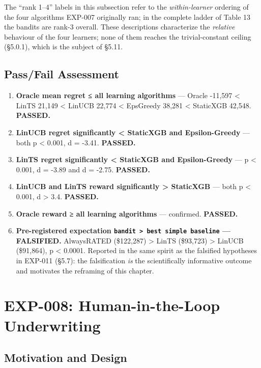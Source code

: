 The ``rank 1--4'' labels in this subsection refer to the \emph{within-learner} ordering of the four algorithms EXP-007 originally ran; in the complete ladder of Table 13 the bandits are rank-3 overall. These descriptions characterize the \emph{relative} behaviour of the four learners; none of them reaches the trivial-constant ceiling (§5.0.1), which is the subject of §5.11.

\subsection{Pass/Fail Assessment}\label{passfail-assessment-2}

\begin{enumerate}
\def\labelenumi{\arabic{enumi}.}
\tightlist
\item
  \textbf{Oracle mean regret ≤ all learning algorithms} --- Oracle -11,597 \textless{} LinTS 21,149 \textless{} LinUCB 22,774 \textless{} EpsGreedy 38,281 \textless{} StaticXGB 42,548. \textbf{PASSED.}
\item
  \textbf{LinUCB regret significantly \textless{} StaticXGB and Epsilon-Greedy} --- both p \textless{} 0.001, d = -3.41. \textbf{PASSED.}
\item
  \textbf{LinTS regret significantly \textless{} StaticXGB and Epsilon-Greedy} --- p \textless{} 0.001, d = -3.89 and d = -2.75. \textbf{PASSED.}
\item
  \textbf{LinUCB and LinTS reward significantly \textgreater{} StaticXGB} --- both p \textless{} 0.001, d \textgreater{} 3.4. \textbf{PASSED.}
\item
  \textbf{Oracle reward ≥ all learning algorithms} --- confirmed. \textbf{PASSED.}
\item
  \textbf{Pre-registered expectation \texttt{bandit\ \textgreater{}\ best\ simple\ baseline} --- FALSIFIED.} AlwaysRATED (\$122,287) \textgreater{} LinTS (\$93,723) \textgreater{} LinUCB (\$91,864), p \textless{} 0.0001. Reported in the same spirit as the falsified hypotheses in EXP-011 (§5.7): the falsification \emph{is} the scientifically informative outcome and motivates the reframing of this chapter.
\end{enumerate}

\section{EXP-008: Human-in-the-Loop Underwriting}\label{exp-008-human-in-the-loop-underwriting}

\subsection{Motivation and Design}\label{motivation-and-design}

